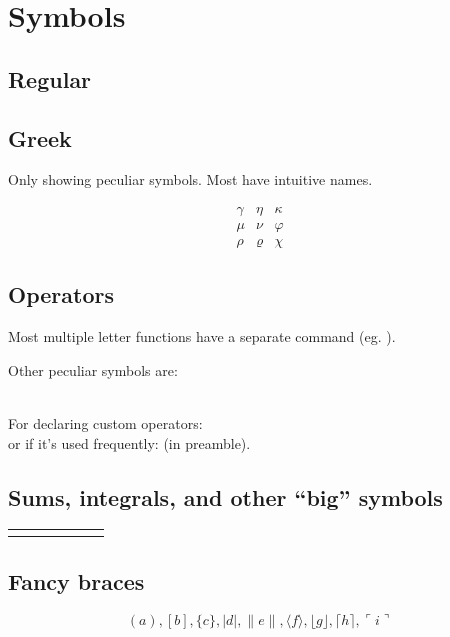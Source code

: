 \section{Symbols}
\subsection*{Regular}
\subsection*{Greek}
Only showing peculiar symbols. Most have intuitive names.\\
\begin{example}
\[\begin{matrix}
  \gamma & \eta    & \kappa\\
  \mu    & \nu     & \varphi\\
  \rho   & \varrho & \chi
\end{matrix}\]
\end{example}
\subsection*{Operators}
Most multiple letter functions have a separate command (eg. \mcodeshow{\sin}).

Other peculiar symbols are:\\
\mcodeshow{\liminf}\\
\mcodeshow{\limsup}

For declaring custom operators:
\\
or if it's used frequently: \code{\DeclareMathOperator*{\atan}{atan}} (in preamble).

\subsection*{Sums, integrals, and other ``big'' symbols}

\begin{longtable}{l l | l l | l l}
  \codeshowB{\sum      }{\prod      }{\coprod}
  \codeshowB{\bigoplus }{\bigotimes }{\bigodot}
  \codeshowB{\bigcup   }{\bigcap    }{\biguplus}
  \codeshowB{\bigsqcup }{\bigvee    }{\bigwedge}
  \codeshowB{\int      }{\oint      }{\iint}
  \codeshowB{\iiint    }{\iiiint    }{\idotsint}
\end{longtable}

\subsection*{Fancy braces}
\begin{example}
\[
( a ), [ b ], \{ c \}, | d |, \| e \|,
\langle f \rangle, \lfloor g \rfloor,
\lceil h \rceil, \ulcorner i \urcorner
\]
\end{example}

